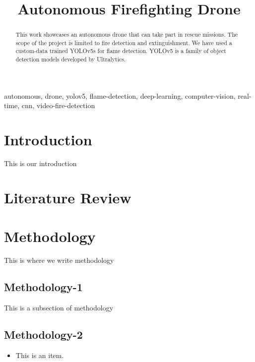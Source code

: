 \documentclass[conference]{IEEEtran}
\begin{document}
\title{Autonomous Firefighting Drone}

\author{
}

\maketitle

\begin{abstract}
This work showcases an autonomous drone that can take part in rescue missions. The scope of the project is limited to fire detection and extinguishment. We have used a custom-data trained YOLOv5s for flame detection. YOLOv5 is a family of object detection models developed by Ultralytics.
\end{abstract}

\begin{IEEEkeywords}
autonomous, drone, yolov5, flame-detection, deep-learning, computer-vision, real-time, cnn, video-fire-detection
\end{IEEEkeywords}

\section{Introduction}
This is our introduction

\section{Literature Review}


\section{Methodology}
This is where we write methodology

\subsection{Methodology-1}\label{AA}
This is a subsection of methodology 

\subsection{Methodology-2}
\begin{itemize}
\item This is an item.
\end{itemize}
\end{document}

